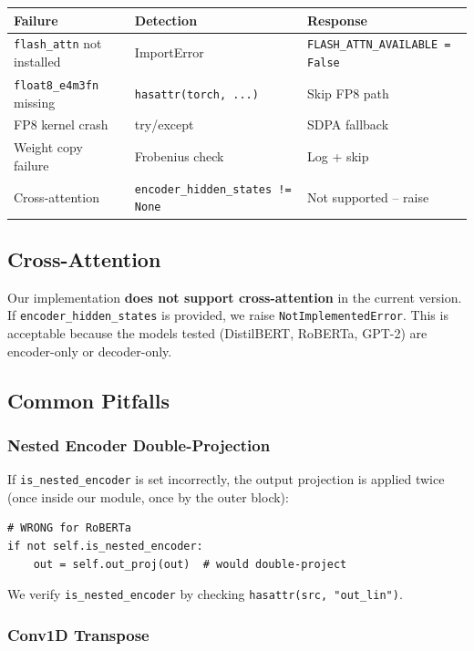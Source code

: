 \begin{table}[H]
\centering
\small
\begin{tabular}{lll}
\toprule
\textbf{Failure} & \textbf{Detection} & \textbf{Response} \\
\midrule
\texttt{flash\_attn} not installed & ImportError & \texttt{FLASH\_ATTN\_AVAILABLE = False} \\
\texttt{float8\_e4m3fn} missing & \texttt{hasattr(torch, ...)} & Skip FP8 path \\
FP8 kernel crash & try/except & SDPA fallback \\
Weight copy failure & Frobenius check & Log + skip \\
Cross-attention & \texttt{encoder\_hidden\_states != None} & Not supported -- raise \\
\bottomrule
\end{tabular}
\end{table}

\subsection{Cross-Attention}

Our implementation \textbf{does not support cross-attention} in the current 
version. If \texttt{encoder\_hidden\_states} is provided, we raise 
\texttt{NotImplementedError}. This is acceptable because the models tested 
(DistilBERT, RoBERTa, GPT-2) are encoder-only or decoder-only.

\subsection{Common Pitfalls}

\subsubsection{Nested Encoder Double-Projection}

If \texttt{is\_nested\_encoder} is set incorrectly, the output projection is applied 
twice (once inside our module, once by the outer block):

\begin{lstlisting}
# WRONG for RoBERTa
if not self.is_nested_encoder:
    out = self.out_proj(out)  # would double-project
\end{lstlisting}

We verify \texttt{is\_nested\_encoder} by checking \texttt{hasattr(src, "out\_lin")}.

\subsubsection{Conv1D Transpose}

